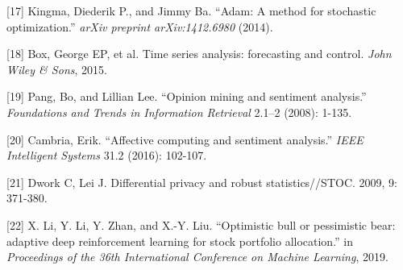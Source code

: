 \documentclass{article}
\begin{document}
[17] Kingma, Diederik P., and Jimmy Ba. ``Adam: A method for stochastic optimization.'' {\em arXiv preprint arXiv:1412.6980} (2014).


[18] Box, George EP, et al. Time series analysis: forecasting and control. {\em John Wiley \& Sons}, 2015.


[19] Pang, Bo, and Lillian Lee. ``Opinion mining and sentiment analysis.'' {\em Foundations and Trends in Information Retrieval} 2.1–2 (2008): 1-135.

[20] Cambria, Erik. ``Affective computing and sentiment analysis.'' {\em IEEE Intelligent Systems} 31.2 (2016): 102-107.

[21] Dwork C, Lei J. Differential privacy and robust statistics//STOC. 2009, 9: 371-380.


[22] X. Li, Y. Li, Y. Zhan, and X.-Y. Liu. ``Optimistic bull or pessimistic bear: adaptive deep reinforcement learning for stock portfolio allocation.'' in {\em Proceedings of the 36th International Conference on Machine Learning}, 2019.
\end{document}
